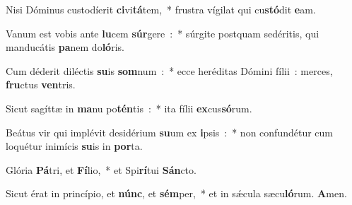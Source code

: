 ﻿\item Nisi Dóminus custodíerit \textbf{ci}vi\textbf{tá}tem,~* frustra vígilat qui cu\textbf{stó}dit \textbf{e}am.
\item Vanum est vobis ante \textbf{lu}cem \textbf{súr}gere~:~* súrgite postquam sedéritis, qui manducátis \textbf{pa}nem do\textbf{ló}ris.
\item Cum déderit diléctis \textbf{su}is \textbf{som}num~:~* ecce heréditas Dómini fílii~: merces, \textbf{fru}ctus \textbf{ven}tris.
\item Sicut sagíttæ in \textbf{ma}nu po\textbf{tén}tis~:~* ita fílii \textbf{ex}cus\textbf{só}rum.
\item Beátus vir qui implévit desidérium \textbf{su}um ex \textbf{i}psis~:~* non confundétur cum loquétur inimícis \textbf{su}is in \textbf{por}ta.
\item Glória \textbf{Pá}tri, et \textbf{Fí}lio,~* et Spi\textbf{rí}tui \textbf{Sán}cto.
\item Sicut érat in princípio, et \textbf{núnc}, et \textbf{sém}per,~* et in sǽcula sæcu\textbf{ló}rum. \textbf{A}men.
